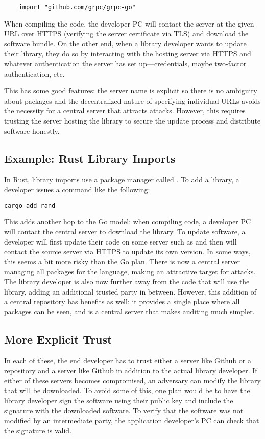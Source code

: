 \begin{lstlisting}	
	import "github.com/grpc/grpc-go"
\end{lstlisting}

When compiling the code, the developer PC will contact the server at the given URL over HTTPS (verifying the server certificate via TLS) and download the software bundle. On the other end, when a library developer wants to update their library, they do so by interacting with the hosting server via HTTPS and whatever authentication the server has set up---credentials, maybe two-factor authentication, etc.

This has some good features: the server name is explicit so there is no ambiguity about packages and the decentralized nature of specifying individual URLs avoids the necessity for a central server that attracts attacks. However, this requires trusting the server hosting the library to secure the update process and distribute software honestly.

\subsection{Example: Rust Library Imports}
In Rust, library imports use a package manager called . To add a library, a developer issues a command like the following:

\begin{lstlisting}[language=sh]
	cargo add rand
\end{lstlisting}

This adds another hop to the Go model: when compiling code, a developer PC will contact the central server  to download the library. To update software, a developer will first update their code on some server such as  and then  will contact the source server via HTTPS to update its own version. In some ways, this seems a bit more risky than the Go plan. There is now a central server managing all packages for the language, making an attractive target for attacks. The library developer is also now further away from the code that will use the library, adding an additional trusted party in between. However, this addition of a central repository has benefits as well: it provides a single place where all packages can be seen, and is a central server that makes auditing much simpler.

\subsection{More Explicit Trust}
In each of these, the end developer has to trust either a server like Github or a repository and a server like Github in addition to the actual library developer. If either of these servers becomes compromised, an adversary can modify the library that will be downloaded. To avoid some of this, one plan would be to have the library developer sign the software using their public key and include the signature with the downloaded software. To verify that the software was not modified by an intermediate party, the application developer's PC can check that the signature is valid. 

